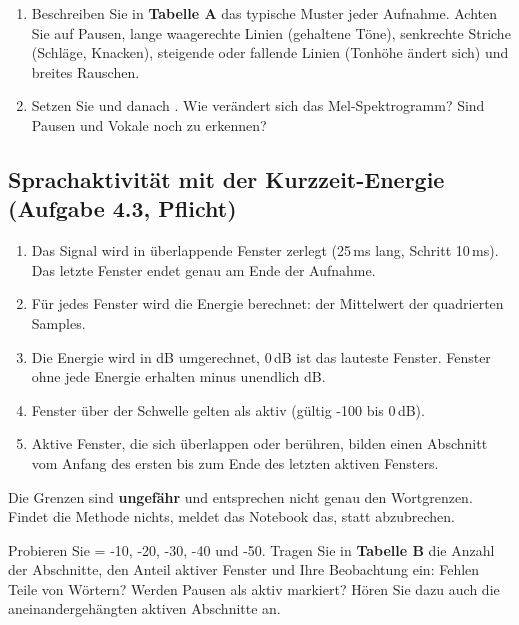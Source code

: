 \documentclass[11pt]{article}
\begin{document}
\begin{block}
\begin{enumerate}
  \item Beschreiben Sie in \textbf{Tabelle A} das typische Muster jeder Aufnahme. Achten Sie auf Pausen, lange waagerechte Linien (gehaltene Töne), senkrechte Striche (Schläge, Knacken), steigende oder fallende Linien (Tonhöhe ändert sich) und breites Rauschen.
  \item Setzen Sie  und danach . Wie verändert sich das Mel-Spektrogramm? Sind Pausen und Vokale noch zu erkennen?
\end{enumerate}
\end{block}

\subsection[Sprachaktivität mit der Kurzzeit-Energie]{Sprachaktivität mit der Kurzzeit-Energie (Aufgabe 4.3, Pflicht)}


\begin{enumerate}[label=\arabic*.]
  \item Das Signal wird in überlappende Fenster zerlegt (25\,ms lang, Schritt 10\,ms). Das letzte Fenster endet genau am Ende der Aufnahme.
  \item Für jedes Fenster wird die Energie berechnet: der Mittelwert der quadrierten Samples.
  \item Die Energie wird in dB umgerechnet, 0\,dB ist das lauteste Fenster. Fenster ohne jede Energie erhalten minus unendlich dB.
  \item Fenster über der Schwelle  gelten als aktiv (gültig -100 bis 0\,dB).
  \item Aktive Fenster, die sich überlappen oder berühren, bilden einen Abschnitt vom Anfang des ersten bis zum Ende des letzten aktiven Fensters.
\end{enumerate}
Die Grenzen sind \textbf{ungefähr} und entsprechen nicht genau den Wortgrenzen. Findet die Methode nichts, meldet das Notebook das, statt abzubrechen.

\begin{block}
Probieren Sie  = -10, -20, -30, -40 und -50. Tragen Sie in \textbf{Tabelle B} die Anzahl der Abschnitte, den Anteil aktiver Fenster und Ihre Beobachtung ein: Fehlen Teile von Wörtern? Werden Pausen als aktiv markiert? Hören Sie dazu auch die aneinandergehängten aktiven Abschnitte an.
\end{block}
\end{document}
